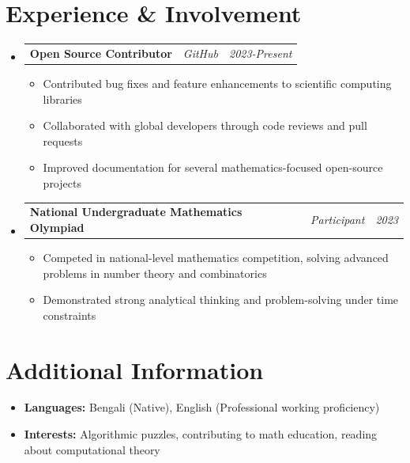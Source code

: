 \documentclass[a4paper, 10pt]{article}
\makeatletter
\newcommand{\resumeheading}[3]{
    \item
    \begin{tabularx}{\linewidth}{@{}l X r@{}}
        \textbf{\large #1} & \textit{#2} & \textit{\small #3} \\
    \end{tabularx}
    \vspace{-8pt}
}
\makeatother
\begin{document}
\section{Experience \& Involvement}
\begin{itemize}[leftmargin=0.15in]
    \resumeheading{Open Source Contributor}{GitHub}{2023-Present}
    \begin{itemize}
        \item Contributed bug fixes and feature enhancements to scientific computing libraries
        \item Collaborated with global developers through code reviews and pull requests
        \item Improved documentation for several mathematics-focused open-source projects
    \end{itemize}
    
    \vspace{4pt}
    \resumeheading{National Undergraduate Mathematics Olympiad}{Participant}{2023}
    \begin{itemize}
        \item Competed in national-level mathematics competition, solving advanced problems in number theory and combinatorics
        \item Demonstrated strong analytical thinking and problem-solving under time constraints
    \end{itemize}
\end{itemize}

\section{Additional Information}
\begin{itemize}
    \item \textbf{Languages:} Bengali (Native), English (Professional working proficiency)
    \item \textbf{Interests:} Algorithmic puzzles, contributing to math education, reading about computational theory
\end{itemize}
\end{document}
